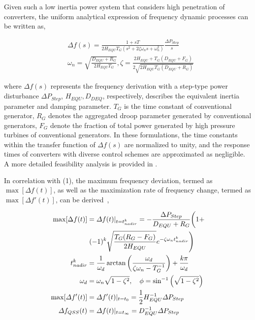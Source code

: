 \documentclass[lettersize,journal]{IEEEtran}
\begin{document}
Given such a low inertia power system that considers high penetration of converters, the uniform analytical expression of frequency dynamic processes can be written as,

\vspace{-0.25cm}
\begin{subequations}
\begin{align}
  \!\!\!\!&\varDelta f(s) \!=\! \frac{1+sT}{2H_{EQU}T_{G}(s^2 + 2\zeta \omega_n s + \omega_n^2)}\frac{\varDelta P_{Step}}{s}\label{eq:Lsfr}\\
  \!\!\!\!&\omega_n \!=\! \sqrt{\!\frac{D_{EQU} \!+\! R_G}{2H_{EQU}T_G}}, \zeta \!=\! \frac{2H_{EQU}  \!+\! T_G(D_{EQU} \!+\! F_G)}{2\sqrt{2H_{EQU}T_G(D_{EQU} \!+\! R_G)}}
\end{align}
\end{subequations}

\noindent
where $\varDelta f(s)$ represents the frequency derivation with a step-type power disturbance $\varDelta P_{Step}$, $H_{EQU},\! D_{DEQ}$, respectively, describes the equivalent inertia parameter and damping parameter. $T_G$ is the time constant of conventional generator, $R_G$ denotes the aggregated droop parameter generated by conventional generators, $F_G$ denote the fraction of total power generated by high pressure turbines of conventional generators. In these formulations, the time constants within the transfer function of $\varDelta f(s)$ are normalized to unity, and the response times of converters with diverse control schemes are approximated as negligible. A more detailed feasibility analysis is provided in \cite{markovic2019optimal}.

In correlation with (1), the maximum frequency deviation, termed as $\max[ \varDelta f(t)]$, as well as the maximization rate of frequency change, termed as $\max[\varDelta f'(t)]$, can be derived~\cite{markovic2019optimal},

\vspace{-0.25cm}
\begin{subequations}
\begin{align}
    \max[\Delta f(t)] &= \varDelta f(t)|_{t=t_{nadir}^k} = -\frac{\Delta P_{Step}}{D_{EQU} + R_G} \bigg( 1 + \notag \\
                      &\left. (-1)^k \sqrt{\frac{T_G(R_G - F_G)}{2H_{EQU}}} e^{-\zeta \omega_n t_{nadir}^k} \right) \label{eq:max_delta_f}\\
    t_{nadir}^k &= \frac{1}{\omega_d} \arctan \left( \frac{\omega_d}{\zeta \omega_n - T_G^{-1}} \right) + \frac{k\pi}{\omega_d}\notag  \\
    \omega_d &= \omega_n \sqrt{1 - \zeta^2}, \quad \phi = \sin^{-1} \left( \sqrt{1 - \zeta^2} \right) \notag\\
  \max[\varDelta f'(t)] &= \varDelta f'(t)|_{t=t_{0}} = \frac{1}{2} H_{EQU}^{-1}\varDelta P_{Step} \label{eq:max_rocof}\\
  \varDelta f_{QSS}(t) &= \varDelta f(t)|_{t=t_{\infty}} = {D_{EQU}^{-1}\varDelta P_{Step}} \label{eq:qss}
\end{align}
\end{subequations}
\end{document}
